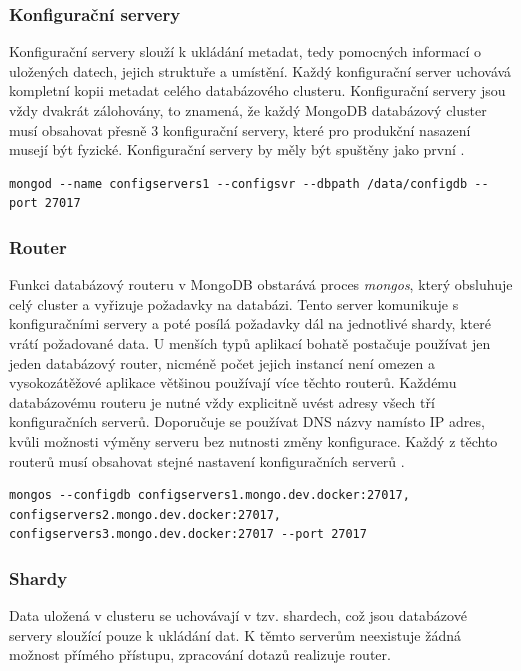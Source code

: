 \subsubsection{Konfigurační servery}
Konfigurační servery slouží k ukládání metadat, tedy pomocných informací o uložených datech, jejich struktuře a umístění. Každý konfigurační server uchovává kompletní kopii metadat celého databázového clusteru. Konfigurační servery jsou vždy dvakrát zálohovány, to znamená, že každý MongoDB databázový cluster musí obsahovat přesně 3 konfigurační servery, které pro produkční nasazení musejí být fyzické. Konfigurační servery by měly být spuštěny jako první \cite{mongoCluster}.

\begin{lstlisting}[caption={Spuštění MongoDB konfiguračního serveru na portu 27017}]
mongod --name configservers1 --configsvr --dbpath /data/configdb --port 27017
\end{lstlisting}
\subsubsection{Router}
Funkci databázový routeru v MongoDB obstarává proces \emph{mongos}, který obsluhuje celý cluster a vyřizuje požadavky na databázi. Tento server komunikuje s konfiguračními servery a poté posílá požadavky dál na jednotlivé shardy, které vrátí požadované data. U menších typů aplikací bohatě postačuje používat jen jeden databázový router, nicméně počet jejich instancí není omezen a vysokozátěžové aplikace většinou používají více těchto routerů. Každému databázovému routeru je nutné vždy explicitně uvést adresy všech tří konfiguračních serverů. Doporučuje se používat DNS názvy namísto IP adres, kvůli možnosti výměny serveru bez nutnosti změny konfigurace. Každý z těchto routerů musí obsahovat stejné nastavení konfiguračních serverů \cite{mongoCluster}.

\vspace{0.25cm}
\begin{lstlisting}[caption={Spuštění MongoDB routeru na portu 27017, se třemi konfiguračními servery}]
mongos --configdb configservers1.mongo.dev.docker:27017, configservers2.mongo.dev.docker:27017, configservers3.mongo.dev.docker:27017 --port 27017
\end{lstlisting}
\subsubsection{Shardy}
Data uložená v clusteru se uchovávají v tzv. shardech, což jsou databázové servery sloužící pouze k ukládání dat. K těmto serverům neexistuje žádná možnost přímého přístupu, zpracování dotazů realizuje router.

